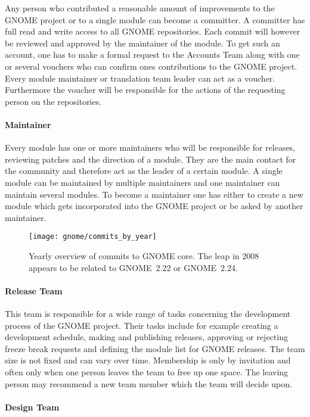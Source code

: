 Any person who contributed a reasonable amount of improvements to the GNOME
project or to a single module can become a committer. A committer has full read
and write access to all GNOME repositories. Each commit will however be
reviewed and approved by the maintainer of the module. To get such an account,
one has to make a formal request to the Accounts Team along with one or several
vouchers who can confirm ones contributions to the GNOME project. Every module
maintainer or translation team leader can act as a voucher. Furthermore the
voucher will be responsible for the actions of the requesting person on the
repositories.

\paragraph{Maintainer}

Every module has one or more maintainers who will be responsible for releases,
reviewing patches and the direction of a module. They are the main contact for
the community and therefore act as the leader of a certain module. A single
module can be maintained by multiple maintainers and one maintainer can
maintain several modules. To become a maintainer one has either to create a new
module which gets incorporated into the GNOME project or be asked by another
maintainer.

\begin{figure}[htbp]
  \centering
  \texttt{[image: gnome/commits\_by\_year]}
  \caption{Yearly overview of commits to GNOME core. The leap in 2008 appears
  to be related to GNOME~2.22 or GNOME~2.24.}
\end{figure}

\paragraph{Release Team}

This team is responsible for a wide range of tasks concerning the development
process of the GNOME project. Their tasks include for example creating a
development schedule, making and publishing releases, approving or rejecting
freeze break requests and defining the module list for GNOME releases. The team
size is not fixed and can vary over time. Membership is only by invitation and
often only when one person leaves the team to free up one space. The leaving
person may recommend a new team member which the team will decide upon.

\paragraph{Design Team}

